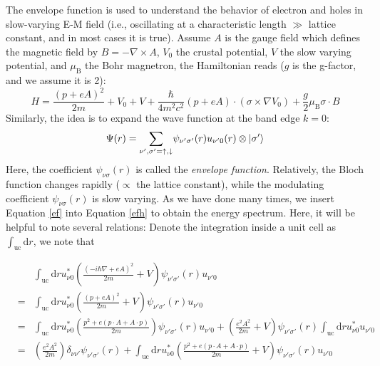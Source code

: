 \documentclass{article}
\begin{document}
The envelope function is used to understand the behavior of electron and holes in slow-varying E-M field (i.e., oscillating at a characteristic length $\gg$ lattice constant, and in most cases it is true). Assume $A$ is the gauge field which defines the magnetic field by $B = -\nabla \times A$, $V_0$ the crustal potential, $V$ the slow varying potential, and $\mu_\text{B}$ the Bohr magnetron, the Hamiltonian reads ($g$ is the g-factor, and we assume it is 2):
\begin{equation}
    H = \frac{(p + e A)^2}{2 m} + V_0 + V + \frac{\hbar}{4 m^2 c^2} (p + e A)\cdot (\sigma \times \nabla V_0) + \frac{g}{2} \mu_{\text{B}} \sigma \cdot B
\label{efh}
\end{equation}
Similarly, the idea is to expand the wave function at the band edge $k=0$:
\begin{equation}
    \Psi (r) = \underset{\nu', \sigma' = \uparrow, \downarrow}{\sum} \psi_{\nu' \sigma'} (r) u_{\nu' 0} (r) \otimes \ket{ \sigma'}
\label{ef}
\end{equation}
Here, the coefficient $\psi_{\nu\sigma}(r)$ is called the \textit{envelope function}. Relatively, the Bloch function changes rapidly ($\propto$ the lattice constant), while the modulating coefficient $\psi_{\nu\sigma}(r)$ is slow varying. As we have done many times, we insert Equation \ref{ef} into Equation \ref{efh} to obtain the energy spectrum. Here, it will be helpful to note several relations:
Denote the integration inside a unit cell as $\int_{\text{uc}}\text{d}r$, we note that

\begin{eqnarray*}  &  & \int_{\text{uc}} \text{d} r u^{\ast}_{\nu 0} \left( \frac{(- i \hbar  \nabla + e A)^2}{2 m} + V \right) \psi_{\nu' \sigma'} (r) u_{\nu' 0}\\  & = & \int_{\text{uc}} \text{d} r u^{\ast}_{\nu 0} \left( \frac{(p + e  A)^2}{2 m} + V \right) \psi_{\nu' \sigma'} (r) u_{\nu' 0}\\  & = & \int_{\text{uc}} \text{d} r u^{\ast}_{\nu 0} \left( \frac{p^2 + e (p  \cdot A + A \cdot p)}{2 m} \right) \psi_{\nu' \sigma'} (r) u_{\nu' 0} +  \left( \frac{e^2 A^2}{2 m} + V \right) \psi_{\nu' \sigma'} (r)  \int_{\text{uc}} \text{d} r u^{\ast}_{\nu 0} u_{\nu' 0}\\  & = & \left( \frac{e^2 A^2}{2 m} \right) \delta_{\nu \nu'} \psi_{\nu'  \sigma'} (r) + \int_{\text{uc}} \text{d} r u^{\ast}_{\nu 0} \left( \frac{p^2  + e (p \cdot A + A \cdot p)}{2 m} + V \right) \psi_{\nu' \sigma'} (r)  u_{\nu' 0}\end{eqnarray*}
\end{document}
